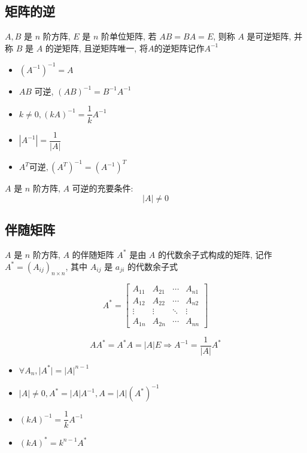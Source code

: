 \subsection{矩阵的逆}

\begin{definition}[逆矩阵]
	
	$A,B$ 是 $n$ 阶方阵, $E$ 是 $n$ 阶单位矩阵, 若 $AB=BA=E$, 则称 $A$ 是可逆矩阵, 并称 $B$ 是 $A$ 的逆矩阵, 且逆矩阵唯一, 将$A$的逆矩阵记作$A^{-1}$

	\begin{itemize}
		\item $(A^{-1})^{-1} = A$
		\item $AB$ 可逆, $(AB)^{-1} = B^{-1}A^{-1}$
		\item $k\neq 0,(kA)^{-1} = \dfrac{1}{k}A^{-1}$
		\item $|A^{-1}| = \dfrac{1}{|A|}$
		\item $A^{T}\text{可逆},(A^{T})^{-1}=(A^{-1})^{T}$
	\end{itemize}

\end{definition}

\begin{theorem}[逆矩阵存在充要条件]
	$A$ 是 $n$ 阶方阵, $A$ 可逆的充要条件:
	$$\big|A\big| \neq 0 $$
\end{theorem}

\subsection{伴随矩阵}

\begin{definition}[伴随矩阵]
	
	$A$ 是 $n$ 阶方阵, $A$ 的伴随矩阵 $A^{*}$ 是由 $A$ 的代数余子式构成的矩阵, 记作 $A^{*}=(A_{ij})_{n\times n}$, 其中 $A_{ij}$ 是 $a_{ji}$ 的代数余子式

	$$A^{*} = 
	\begin{bmatrix}
		A_{11} & A_{21} & \cdots & A_{n1}\\
		A_{12} & A_{22} & \cdots & A_{n2}\\
		\vdots & \vdots & \ddots & \vdots\\
		A_{1n} & A_{2n} & \cdots & A_{nn}
	\end{bmatrix}$$

	$$AA^{*}=A^{*}A=|A|E\Rightarrow A^{-1}=\frac{1}{|A|}A^{*}$$
	

	\begin{itemize}
		\item $\forall A_{n}, \big|A^{*}\big| = \big|A\big|^{n-1}$
		\item $|A|\neq 0, A^{*}=|A|A^{-1}, A=|A|(A^{*})^{-1}$
		\item $(kA)^{-1} = \dfrac{1}{k}A^{-1}$
		\item $(kA)^{*} = k^{n-1}A^{*}$
	\end{itemize}
\end{definition}

